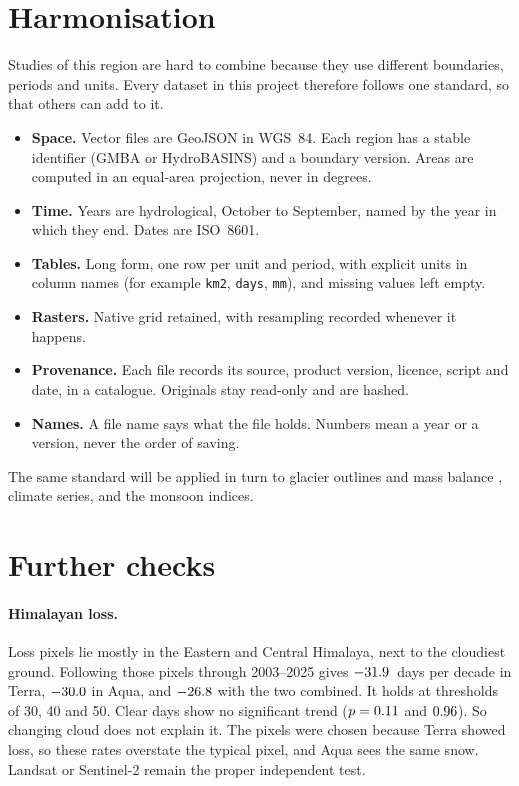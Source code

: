 \documentclass[11pt,a4paper]{article}
\begin{document}
\section{Harmonisation}
Studies of this region are hard to combine because they use different boundaries, periods and units. Every dataset in this project therefore follows one standard, so that others can add to it.

\begin{itemize}
\item \textbf{Space.} Vector files are GeoJSON in WGS~84. Each region has a stable identifier (GMBA or HydroBASINS) and a boundary version. Areas are computed in an equal-area projection, never in degrees.
\item \textbf{Time.} Years are hydrological, October to September, named by the year in which they end. Dates are ISO~8601.
\item \textbf{Tables.} Long form, one row per unit and period, with explicit units in column names (for example \texttt{km2}, \texttt{days}, \texttt{mm}), and missing values left empty.
\item \textbf{Rasters.} Native grid retained, with resampling recorded whenever it happens.
\item \textbf{Provenance.} Each file records its source, product version, licence, script and date, in a catalogue. Originals stay read-only and are hashed.
\item \textbf{Names.} A file name says what the file holds. Numbers mean a year or a version, never the order of saving.
\end{itemize}

The same standard will be applied in turn to glacier outlines and mass balance \citep{Hugonnet_2021}, climate series, and the monsoon indices.

\section{Further checks}
\paragraph{Himalayan loss.} Loss pixels lie mostly in the Eastern and Central Himalaya, next to the cloudiest ground. Following those pixels through 2003--2025 gives $-31.9{}$~days per decade in Terra, $-30.0{}$ in Aqua, and $-26.8{}$ with the two combined. It holds at thresholds of 30, 40 and 50. Clear days show no significant trend ($p=0.11{}$ and $0.96{}$). So changing cloud does not explain it. The pixels were chosen because Terra showed loss, so these rates overstate the typical pixel, and Aqua sees the same snow. Landsat or Sentinel-2 remain the proper independent test.
\end{document}
